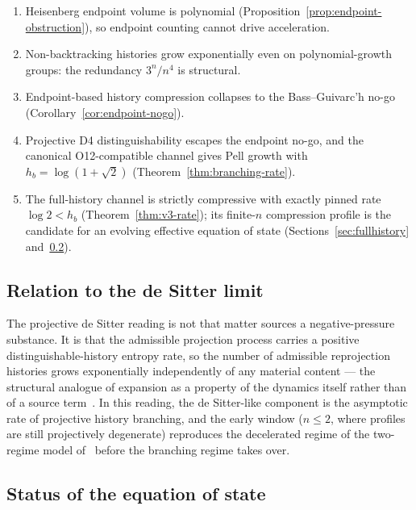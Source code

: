 \documentclass[11pt]{article}
\newcommand{\hb}{h_b}
\begin{document}
\begin{enumerate}
\item Heisenberg endpoint volume is polynomial (Proposition~\ref{prop:endpoint-obstruction}), so endpoint
counting cannot drive acceleration.
\item Non-backtracking histories grow exponentially even on polynomial-growth groups: the redundancy
$3^n/n^4$ is structural.
\item Endpoint-based history compression collapses to the Bass--Guivarc'h no-go
(Corollary~\ref{cor:endpoint-nogo}).
\item Projective D4 distinguishability escapes the endpoint no-go, and the canonical O12-compatible channel
gives Pell growth with $\hb=\log(1+\sqrt2)$ (Theorem~\ref{thm:branching-rate}).
\item The full-history channel is strictly compressive with exactly pinned rate $\log 2<\hb$
(Theorem~\ref{thm:v3-rate}); its finite-$n$ compression profile is the candidate for an evolving effective
equation of state (Sections~\ref{sec:fullhistory} and~\ref{sec:eos}).
\end{enumerate}

\subsection{Relation to the de Sitter limit}
\label{sec:desitter}

The projective de Sitter reading is not that matter sources a negative-pressure substance.
It is that the admissible projection process carries a positive distinguishable-history entropy rate, so the
number of admissible reprojection histories grows exponentially independently of any material content ---
the structural analogue of expansion as a property of the dynamics itself rather than of a
source term~\cite{deSitter1917}.
In this reading, the de Sitter-like component is the asymptotic rate of projective history branching, and
the early window ($n\le2$, where profiles are still projectively degenerate) reproduces the decelerated
regime of the two-regime model of~\cite{Beau2026a5} before the branching regime takes over.

\subsection{Status of the equation of state}
\label{sec:eos}
\end{document}

